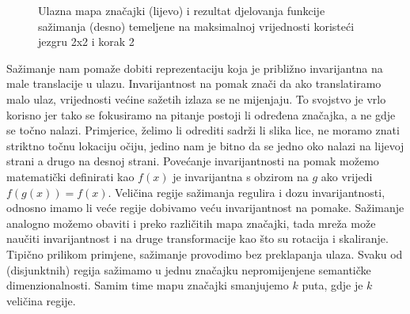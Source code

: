 \documentclass[times, utf8, diplomski]{fer}
\theoremstyle{definition}
\begin{document}
\begin{figure}[h]
\begin{center}
\qquad
{}

\end{center}
\caption{Ulazna mapa značajki (lijevo) i rezultat djelovanja funkcije sažimanja (desno) temeljene na maksimalnoj vrijednosti koristeći jezgru 2x2 i korak  2 }
\end{figure}

Sažimanje nam pomaže dobiti reprezentaciju koja je približno invarijantna na male translacije u ulazu. Invarijantnost na pomak znači da ako translatiramo malo ulaz, vrijednosti većine sažetih izlaza se ne mijenjaju. To svojstvo je vrlo korisno jer tako se fokusiramo na pitanje postoji li određena značajka, a ne gdje se točno nalazi. Primjerice, želimo li odrediti sadrži li slika lice, ne moramo znati striktno točnu lokaciju očiju, jedino nam je bitno da se jedno oko nalazi na lijevoj strani a drugo na desnoj strani. Povećanje invarijantnosti na pomak možemo matematički definirati kao $f(x)$ je invarijantna s obzirom na $g$ ako vrijedi $f(g(x)) =f(x)$. Veličina regije sažimanja regulira i dozu invarijantnosti, odnosno imamo li veće regije dobivamo veću invarijantnost na pomake. Sažimanje analogno možemo obaviti i preko različitih mapa značajki, tada mreža može naučiti invarijantnost i na druge transformacije kao što su rotacija i skaliranje.
Tipično prilikom primjene, sažimanje provodimo bez preklapanja ulaza. Svaku od (disjunktnih) regija sažimamo u jednu značajku nepromijenjene semantičke dimenzionalnosti. Samim time mapu značajki smanjujemo $k$ puta, gdje je $k$ veličina regije.
\end{document}
